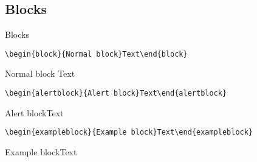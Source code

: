 \subsection{Blocks}
\begin{frame}[fragile, shrink=30]{Blocks}
\begin{verbatim}
\begin{block}{Normal block}Text\end{block}
\end{verbatim}
\begin{block}{Normal block}
    Text
\end{block}

\begin{verbatim}
\begin{alertblock}{Alert block}Text\end{alertblock}
\end{verbatim}
\begin{alertblock}{Alert block}Text\end{alertblock}

\begin{verbatim}
\begin{exampleblock}{Example block}Text\end{exampleblock}
\end{verbatim}
\begin{exampleblock}{Example block}Text\end{exampleblock}
\end{frame}